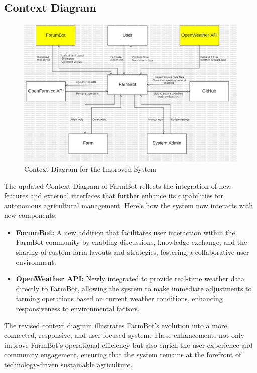 \subsection{Context Diagram}
\begin{figure}[htbp]
    \centering
    \includegraphics[width=1\linewidth]{Figures/improved_context_diagram.jpg}
    \caption{Context Diagram for the Improved System}
    \label{ContextImproved}
\end{figure}
\newpage
The updated Context Diagram of FarmBot reflects the integration of new features and external interfaces that further enhance its capabilities for autonomous agricultural management. Here’s how the system now interacts with new components:
\begin{itemize}
    \item \textbf{ForumBot:} A new addition that facilitates user interaction within the FarmBot community by enabling discussions, knowledge exchange, and the sharing of custom farm layouts and strategies, fostering a collaborative user environment.
    \item \textbf{OpenWeather API:} Newly integrated to provide real-time weather data directly to FarmBot, allowing the system to make immediate adjustments to farming operations based on current weather conditions, enhancing responsiveness to environmental factors.
\end{itemize}
The revised context diagram illustrates FarmBot’s evolution into a more connected, responsive, and user-focused system. These enhancements not only improve FarmBot's operational efficiency but also enrich the user experience and community engagement, ensuring that the system remains at the forefront of technology-driven sustainable agriculture.


